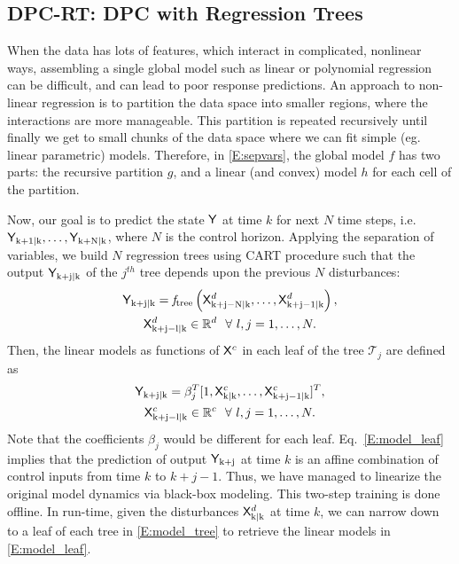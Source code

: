 \subsection{DPC-RT: DPC with Regression Trees}
\label{SS:dpcrt}
When the data has lots of features, which interact in complicated, nonlinear ways, assembling a single global model such as linear or polynomial regression can be difficult, and can lead to poor response predictions.
An approach to non-linear regression is to partition the data space into smaller regions, where the interactions are more manageable. 
This partition is repeated recursively until finally we get to small chunks of the data space where we can fit simple (eg. linear parametric) models. 
Therefore, in \eqref{E:sepvars}, the global model $f$ has two parts: the recursive partition $g$, and a linear (and convex) model $h$ for each cell of the partition.

Now, our goal is to predict the state $\mathsf{Y}$ at time $k$ for next $N$ time steps, i.e. $\mathsf{Y}_{\mathrm{k+1|k}},\dots,\mathsf{Y}_{\mathrm{k+N|k}}$, where $N$ is the control horizon. Applying the separation of variables, we build $N$ regression trees using CART procedure \cite{Breiman1984} such that the output $\mathsf{Y}_{\mathrm{k+j|k}}$ of the $j^{th}$ tree depends upon the previous $N$ disturbances:
\begin{gather}
\label{E:model_tree}
\mathsf{Y}_{\mathrm{k+j|k}} = \mathit{f}_{\mathrm{tree}} \left( \mathsf{X}^d_{\mathrm{k+j-N|k}} ,\dots,\mathsf{X}^d_{\mathrm{k+j-1|k}}  \right), \\ \nonumber
\mathsf{X}^d_{\mathrm{k+j-l|k}} \in \mathbb{R}^d \  \ \forall \ l,j=1,\dots,N.
\end{gather}
Then, the linear models as functions of $\mathsf{X}^c$ in each leaf of the tree $\mathcal{T}_j$ are defined as
\begin{gather}
\label{E:model_leaf}
\mathsf{Y}_{\mathrm{k+j|k}} =  \beta^T_j [1,\mathsf{X}^c_{\mathrm{k|k}},\dots,\mathsf{X}^c_{\mathrm{k+j-1|k}} ]^T, \\ \nonumber
\mathsf{X}^c_{\mathrm{k+j-l|k}} \in \mathbb{R}^c \  \ \forall \ l,j=1,\dots,N.
\end{gather}
Note that the coefficients $\beta_j$ would be different for each leaf. Eq.~\eqref{E:model_leaf} implies that the prediction of output $\mathsf{Y}_{\mathrm{k+j}}$ at time $k$ is an affine combination of control inputs from time $k$ to $k+j-1$. Thus, we have managed to linearize the original model dynamics via black-box modeling. This two-step training is done offline. In run-time, given the disturbances $\mathsf{X}^d_\mathrm{k|k}$ at time $k$, we can narrow down to a leaf of each tree in \eqref{E:model_tree} to retrieve the linear models in \eqref{E:model_leaf}.

